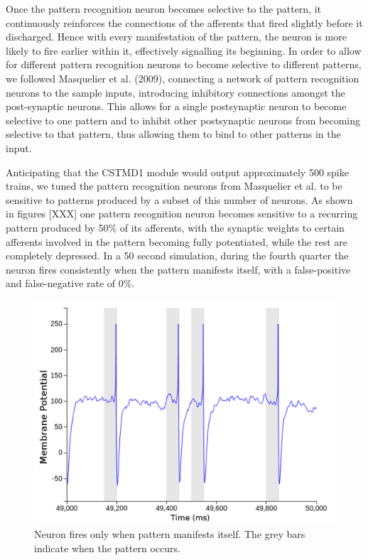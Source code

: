 \documentclass[a4paper,11pt]{article}
\begin{document}
	Once the pattern recognition neuron becomes selective to the pattern, it continuously reinforces the connections of the afferents that fired slightly before it discharged. Hence with every manifestation of the pattern, the neuron is more likely to fire earlier within it, effectively signalling its beginning. In order to allow for different pattern recognition neurons to become selective to different patterns, we followed Masquelier et al. (2009), connecting a network of pattern recognition neurons to the sample inputs, introducing inhibitory connections amongst the post-synaptic neurons. This allows for a single postsynaptic neuron to become selective to one pattern and to inhibit other postsynaptic neurons from becoming selective to that pattern, thus allowing them to bind to other patterns in the input.\par

Anticipating that the CSTMD1 module would output approximately 500 spike trains, we tuned the pattern recognition neurons from Masquelier et al. to be sensitive to patterns produced by a subset of this number of neurons. As shown in figures [XXX] one pattern recognition neuron becomes sensitive to a recurring pattern produced by 50\% of its afferents, with the synaptic weights to certain afferents involved in the pattern becoming fully potentiated, while the rest are completely depressed. In a 50 second simulation, during the fourth quarter the neuron fires consistently when the pattern manifests itself, with a false-positive and false-negative rate of 0\%.

\begin{figure}[H]
\centering
\includegraphics[scale = 0.4]{pr1}
\caption{Neuron fires only when pattern manifests itself. The grey bars indicate when the pattern occurs.}
\end{figure}
\end{document}
